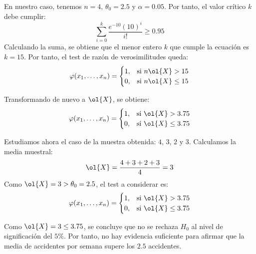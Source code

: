 \begin{ejemplo}
\begin{itemize}
\begin{itemize}
            En nuestro caso, tenemos $n=4$, $\theta_0 = 2.5$ y $\alpha = 0.05$. Por tanto, el valor crítico $k$ debe cumplir:
            \begin{equation*}
                \sum\limits_{i=0}^{k} \frac{e^{-10}(10)^i}{i!} \geq 0.95
            \end{equation*}
            Calculando la suma, se obtiene que el menor entero $k$ que cumple la ecuación es $k=15$. Por tanto, el test de razón de verosimilitudes queda:
            \begin{equation*}
                \varphi(x_1, \dots, x_n) =
                \begin{cases}
                    1, & \text{si } n\ol{X} > 15 \\
                    0, & \text{si } n\ol{X} \leq 15
                \end{cases}
            \end{equation*}

            Transformando de nuevo a $\ol{X}$, se obtiene:
            \begin{equation*}
                \varphi(x_1, \dots, x_n) =
                \begin{cases}
                    1, & \text{si } \ol{X} > 3.75 \\
                    0, & \text{si } \ol{X} \leq 3.75
                \end{cases}
            \end{equation*}
        \end{itemize}
    \end{itemize}

    Estudiamos ahora el caso de la muestra obtenida: $4$, $3$, $2$ y $3$. Calculamos la media muestral:
    \begin{equation*}
        \ol{X} = \frac{4 + 3 + 2 + 3}{4} = 3
    \end{equation*}
    Como $\ol{X} = 3 > \theta_0 = 2.5$, el test a considerar es:
    \begin{equation*}
        \varphi(x_1, \dots, x_n) =
        \begin{cases}
            1, & \text{si } \ol{X} > 3.75 \\
            0, & \text{si } \ol{X} \leq 3.75
        \end{cases}
    \end{equation*}

    Como $\ol{X} = 3 \leq 3.75$, se concluye que no se rechaza $H_0$ al nivel de significación del $5\%$. Por tanto, no hay evidencia suficiente para afirmar que la media de accidentes por semana supere los $2.5$ accidentes.
\end{ejemplo}

